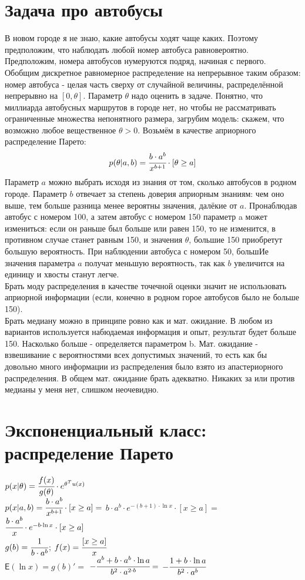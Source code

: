 \documentclass[10pt]{extarticle}
\newcommand{\Expect}{\mathsf{E}}
\begin{document}
    \section{Задача про автобусы}
    В новом городе я не знаю, какие автобусы ходят чаще каких. Поэтому предположим, что наблюдать любой номер автобуса равновероятно. Предположим, номера автобусов нумеруются подряд, начиная с первого. Обобщим дискретное равномерное распределение на непрерывное таким образом: номер автобуса - целая часть сверху от случайной величины, распределённой непрерывно на $[0, \theta]$. Параметр $\theta$ надо оценить в задаче. Понятно, что миллиарда автобусных маршрутов в городе нет, но чтобы не рассматривать ограниченные множества непонятного размера, загрубим модель: скажем, что возможно любое вещественное $\theta > 0$. Возьмём в качестве априорного распределение Парето:
    $$p(\theta | a, b) = \cfrac{b \cdot a^b}{x^{b + 1}} \cdot [\theta \geq a]$$
    Параметр $a$ можно выбрать исходя из знания от том, сколько автобусов в родном городе. Параметр $b$ отвечает за степень доверия априорным знаниям: чем оно выше, тем больше разница менее вероятны значения, далёкие от $a$. Пронаблюдав автобус с номером 100, а затем автобус с номером 150 параметр a может измениться: если он раньше был больше или равен 150, то не изменится, в противном случае станет равным 150, и значения $\theta$, большие 150 приобретут большую вероятность. При наблюдении автобуса с номером 50, большИе значения параметра $a$ получат меньшую вероятность, так как $b$ увеличится на единицу и хвосты станут легче. \\
    Брать моду распределения в качестве точечной оценки значит не использовать априорной информации (если, конечно в родном горое автобусов было не больше 150). \\
    Брать медиану можно в принципе ровно как и мат. ожидание. В любом из вариантов используется набюдаемая информация и опыт, результат будет больше 150. Насколько больше - определяется параметром b. Мат. ожидание - взвешивание с вероятностями всех допустимых значений, то есть как бы довольно много информации из распределения было взято из апастериорного распределения. В общем мат. ожидание брать адекватно. Никаких за или против медианы у меня нет, слишком неочевидно.
    \section{Экспоненциальный класс: распределение Парето}
    $p(x | \theta) = \cfrac{f(x)}{g(\theta)} \cdot e^{\theta^T u(x)}$\\
    $p(x | a, b) = \cfrac{b \cdot a^b}{x^{b + 1}} \cdot [x \geq a] =$
    $b \cdot a^b \cdot e^{-(b + 1) \cdot \ln x} \cdot [x \geq a] =$
    $\cfrac{b \cdot a^b}{x} \cdot e^{-b \cdot \ln x} \cdot [x \geq a]$ \\
    $g(b) = \cfrac{1}{b \cdot a^b}$;
    $f(x) = \cfrac{[x \geq a]}{x}$ \\
    $\Expect(\ln x) = g(b)' =$
    $-\cfrac{a^b + b \cdot a^b \cdot \ln a}{b^2 \cdot a^{2 \cdot b}} = $
    $-\cfrac{1 + b \cdot \ln a}{b^2 \cdot a^{b}}$
\end{document}
